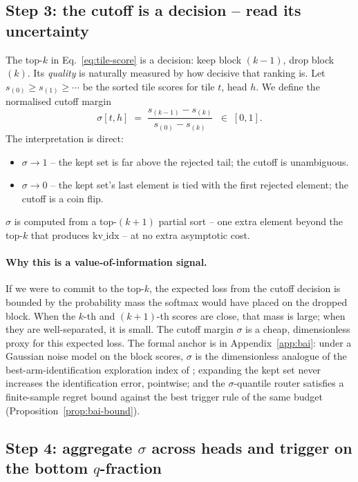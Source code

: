 \documentclass[11pt]{article}
\theoremstyle{remark}
\begin{document}
\subsection{Step 3: the cutoff is a decision -- read its uncertainty}

The top-$k$ in Eq.~\eqref{eq:tile-score} is a decision: keep block $(k{-}1)$, drop block $(k)$. Its \emph{quality} is naturally measured by how decisive that ranking is.
Let $s_{(0)} \ge s_{(1)} \ge \cdots$ be the sorted tile scores for tile $t$, head $h$. We define the normalised cutoff margin
\begin{equation}\label{eq:sigma-def}
\sigma[t,h] \;=\; \frac{s_{(k-1)} - s_{(k)}}{s_{(0)} - s_{(k)}} \;\;\in\;[0,1].
\end{equation}
The interpretation is direct:
\begin{itemize}[leftmargin=*,topsep=0.2em,itemsep=0.1em]
    \item $\sigma \to 1$ -- the kept set is far above the rejected tail; the cutoff is unambiguous.
    \item $\sigma \to 0$ -- the kept set's last element is tied with the first rejected element; the cutoff is a coin flip.
\end{itemize}
$\sigma$ is computed from a top-$(k{+}1)$ partial sort -- one extra element beyond the top-$k$ that produces $\text{kv\_idx}$ -- at no extra asymptotic cost.

\paragraph{Why this is a value-of-information signal.} If we were to commit to the top-$k$, the expected loss from the cutoff decision is bounded by the probability mass the softmax would have placed on the dropped block. When the $k$-th and $(k{+}1)$-th scores are close, that mass is large; when they are well-separated, it is small. The cutoff margin $\sigma$ is a cheap, dimensionless proxy for this expected loss. The formal anchor is in Appendix~\ref{app:bai}: under a Gaussian noise model on the block scores, $\sigma$ is the dimensionless analogue of the best-arm-identification exploration index of \citet{garivier2016optimal}; expanding the kept set never increases the identification error, pointwise; and the $\sigma$-quantile router satisfies a finite-sample regret bound against the best trigger rule of the same budget (Proposition~\ref{prop:bai-bound}).

\subsection{Step 4: aggregate $\sigma$ across heads and trigger on the bottom $q$-fraction}
\end{document}
